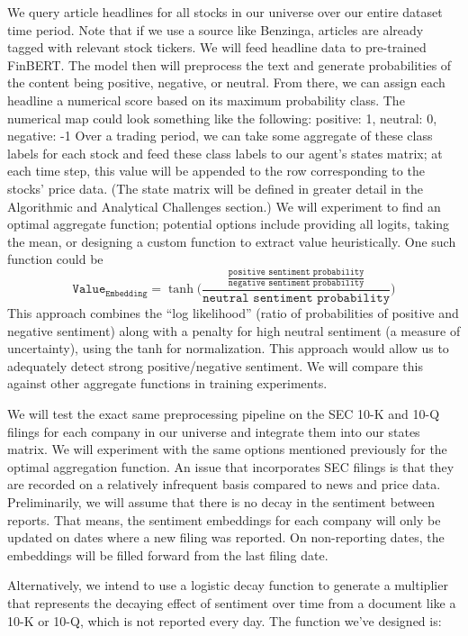 We query article headlines for all stocks in our universe over our entire dataset time period.
Note that if we use a source like Benzinga, articles are already tagged 
with relevant stock tickers. We will feed headline data to pre-trained FinBERT. 
The model then will preprocess the text and generate probabilities of the content 
being positive, negative, or neutral. From there, we can assign each headline a 
numerical score based on its maximum probability class. The numerical map could 
look something like the following:  {positive: 1, neutral: 0, negative: -1} 
Over a trading period, we can take some aggregate of these class labels for 
each stock and feed these class labels to our agent’s states matrix; at each 
time step, this value will be appended to the row corresponding to the stocks’ 
price data. (The state matrix will be defined in greater detail in the Algorithmic 
and Analytical Challenges section.) We will experiment to find an optimal 
aggregate function; potential options include providing all logits, 
taking the mean, or designing a custom function to extract value heuristically. 
One such function could be
\[\texttt{Value}_{\texttt{Embedding}} = \tanh\Biggl( \frac{\frac{\texttt{positive sentiment probability}}{\texttt{negative sentiment probability}}}{\texttt{neutral sentiment probability}} \Biggr)\]
This approach combines the “log likelihood” (ratio of probabilities of positive and 
negative sentiment) along with a penalty for high neutral sentiment (a measure of 
uncertainty), using the tanh for normalization. This approach would allow us to 
adequately detect strong positive/negative sentiment. We will compare this against 
other aggregate functions in training experiments.

We will test the exact same preprocessing pipeline on the SEC 10-K and 10-Q filings 
for each company in our universe and integrate them into our states matrix. We will 
experiment with the same options mentioned previously for the optimal aggregation 
function. An issue that incorporates SEC filings is that they are recorded on a 
relatively infrequent basis compared to news and price data. Preliminarily, we will 
assume that there is no decay in the sentiment between reports. That means, 
the sentiment embeddings for each company will only be updated on dates where a
new filing was reported. On non-reporting dates, the embeddings will be filled 
forward from the last filing date.

Alternatively, we intend to use a logistic decay function to generate a multiplier that represents the decaying effect of sentiment over time from a document like a 10-K or 10-Q, which is not reported every day. The function we've designed is:

